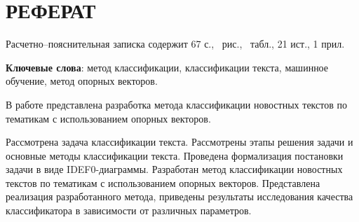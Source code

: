 \part*{РЕФЕРАТ}

Расчетно--пояснительная записка содержит 67 с., \totalfigures\ рис., \totaltables\ табл., 21 ист., 1 прил.

\textbf{Ключевые слова}: метод классификации, классификации текста, машинное обучение, метод опорных векторов.

В работе представлена разработка метода классификации новостных текстов по тематикам с использованием опорных векторов.

Рассмотрена задача классификации текста. Рассмотрены этапы решения задачи и основные методы классификации текста. Проведена формализация постановки задачи в виде IDEF0-диаграммы. Разработан метод классификации новостных текстов по тематикам с использованием опорных векторов. Представлена реализация разработанного метода, приведены результаты исследования качества классификатора в зависимости от различных параметров.
